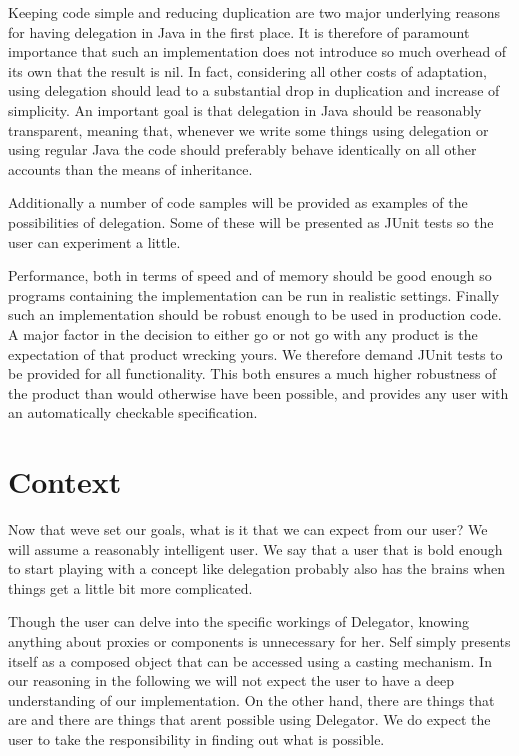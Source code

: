 \documentclass[a4paper,12pt]{book}
\begin{document}
Keeping code simple and reducing duplication are two major underlying reasons for having delegation in Java in the first place. It is therefore of paramount importance that such an implementation does not introduce so much overhead of its own that the result is nil. In fact, considering all other costs of adaptation, using delegation should 
lead to a substantial drop in duplication and increase of simplicity. An important goal is that delegation in Java should be reasonably transparent, meaning that, whenever we write some things using delegation or using regular Java the code should preferably behave identically on all other accounts than the means of inheritance.

Additionally a number of code samples will be provided as examples of the possibilities of delegation. Some of these will be presented as JUnit tests so the user can experiment a little.

Performance, both in terms of speed and of memory should be good enough so programs containing the implementation can be run in realistic settings. Finally such an implementation should be robust enough to be used in production code. A major factor in the decision to either go or not go with any product is the expectation of that product wrecking yours. We therefore demand JUnit tests to be provided for all functionality. This both ensures a much higher robustness of the product than would otherwise have been possible, and provides any user with an automatically checkable specification.

\section*{Context}
Now that weve set our goals, what is it that we can expect from our user? We will assume a reasonably intelligent user. We say that a user that is bold enough to start playing with a concept like delegation probably also has the brains when things get a little bit more complicated.

Though the user can delve into the specific workings of Delegator, knowing anything about proxies or components is unnecessary for her. Self simply presents itself as a composed object that can be accessed using a casting mechanism. In our reasoning in the following we will not expect the user to have a deep understanding of our implementation. On the other hand, there are things that are and there are things that arent possible using Delegator. We do expect the user to take the responsibility in finding out what is possible.
\end{document}
